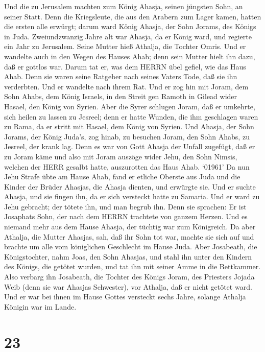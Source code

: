 Und die zu Jerusalem machten zum König Ahasja, seinen
jüngsten Sohn, an seiner Statt. Denn die Kriegsleute, die aus den
Arabern zum Lager kamen, hatten die ersten alle erwürgt; darum ward
König Ahasja, der Sohn Jorams, des Königs in Juda. 
Zweiundzwanzig Jahre alt war Ahasja, da er König ward, und regierte ein
Jahr zu Jerusalem. Seine Mutter hieß Athalja, die Tochter Omris.
 Und er wandelte auch in den Wegen des Hauses Ahab; denn
sein Mutter hielt ihn dazu, daß er gottlos war.  Darum tat
er, was dem HERRN übel gefiel, wie das Haus Ahab. Denn sie waren seine
Ratgeber nach seines Vaters Tode, daß sie ihn verderbten. 
Und er wandelte nach ihrem Rat. Und er zog hin mit Joram, dem Sohn
Ahabs, dem König Israels, in den Streit gen Ramoth in Gilead wider
Hasael, den König von Syrien. Aber die Syrer schlugen Joram,
 daß er umkehrte, sich heilen zu lassen zu Jesreel; denn er
hatte Wunden, die ihm geschlagen waren zu Rama, da er stritt mit Hasael,
dem König von Syrien. Und Ahasja, der Sohn Jorams, der König Juda's, zog
hinab, zu besuchen Joram, den Sohn Ahabs, zu Jesreel, der krank lag.
 Denn es war von Gott Ahasja der Unfall zugefügt, daß er zu
Joram käme und also mit Joram auszöge wider Jehu, den Sohn Nimsis,
welchen der HERR gesalbt hatte, auszurotten das Haus Ahab. 
`01961' Da nun Jehu Strafe übte am Hause Ahab, fand er etliche Oberste
aus Juda und die Kinder der Brüder Ahasjas, die Ahasja dienten, und
erwürgte sie.  Und er suchte Ahasja, und sie fingen ihn, da
er sich versteckt hatte zu Samaria. Und er ward zu Jehu gebracht; der
tötete ihn, und man begrub ihn. Denn sie sprachen: Er ist Josaphats
Sohn, der nach dem HERRN trachtete von ganzem Herzen. Und es niemand
mehr aus dem Hause Ahasja, der tüchtig war zum Königreich. 
Da aber Athalja, die Mutter Ahasjas, sah, daß ihr Sohn tot war, machte
sie sich auf und brachte um alle vom königlichen Geschlecht im Hause
Juda.  Aber Josabeath, die Königstochter, nahm Joas, den
Sohn Ahasjas, und stahl ihn unter den Kindern des Königs, die getötet
wurden, und tat ihn mit seiner Amme in die Bettkammer. Also verbarg ihn
Josabeath, die Tochter des Königs Joram, des Priesters Jojada Weib (denn
sie war Ahasjas Schwester), vor Athalja, daß er nicht getötet ward.
 Und er war bei ihnen im Hause Gottes versteckt sechs
Jahre, solange Athalja Königin war im Lande.

\hypertarget{section-22}{%
\section{23}\label{section-22}}

